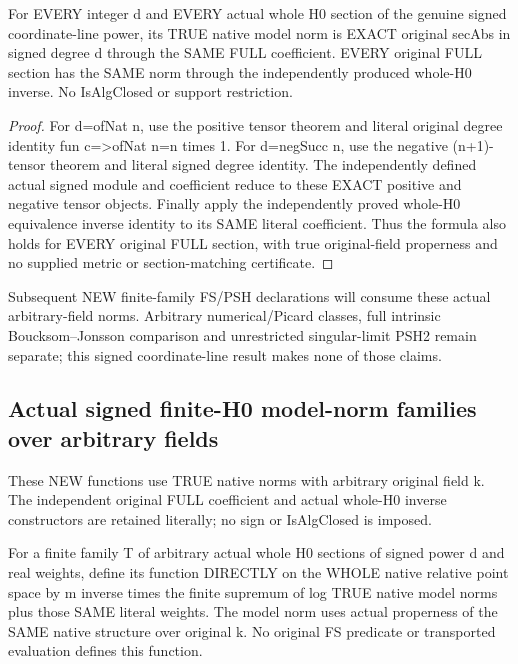 \begin{theorem}
\label{thm:seven-native-signed-full-norms-arbitrary-field}
\leanok
For EVERY integer d and EVERY actual whole H0 section of the genuine
signed coordinate-line power, its TRUE native model norm is EXACT
original secAbs in signed degree d through the SAME FULL coefficient.
EVERY original FULL section has the SAME norm through the independently
produced whole-H0 inverse. No IsAlgClosed or support restriction.
\end{theorem}
\begin{proof}
For d=ofNat n, use the positive tensor theorem and literal original
degree identity fun c=>ofNat n=n times 1. For d=negSucc n, use the
negative (n+1)-tensor theorem and literal signed degree identity.
The independently defined actual signed module and coefficient reduce
to these EXACT positive and negative tensor objects. Finally apply
the independently proved whole-H0 equivalence inverse identity to its
SAME literal coefficient. Thus the formula also holds for EVERY original
FULL section, with true original-field properness and no supplied metric
or section-matching certificate.
\end{proof}

Subsequent NEW finite-family FS/PSH declarations will consume these actual
arbitrary-field norms. Arbitrary numerical/Picard classes, full intrinsic
Boucksom--Jonsson comparison and unrestricted singular-limit PSH2 remain
separate; this signed coordinate-line result makes none of those claims.

\subsection{Actual signed finite-H0 model-norm families over arbitrary fields}
These NEW functions use TRUE native norms with arbitrary original field k.
The independent original FULL coefficient and actual whole-H0 inverse
constructors are retained literally; no sign or IsAlgClosed is imposed.

\begin{definition}
\label{def:seven-native-signed-family-norm-arbitrary-field}
\leanok
For a finite family T of arbitrary actual whole H0 sections of signed
power d and real weights, define its function DIRECTLY on the WHOLE
native relative point space by m inverse times the finite supremum of
log TRUE native model norms plus those SAME literal weights. The model
norm uses actual properness of the SAME native structure over original k.
No original FS predicate or transported evaluation defines this function.
\end{definition}

